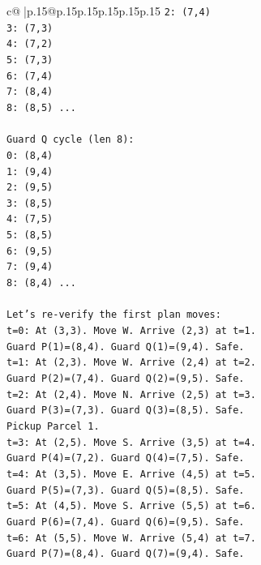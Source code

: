 \documentclass{article}
\begin{document}
{\begin{supertabular}{c@{$\;$}|p{.15\linewidth}@{}p{.15\linewidth}p{.15\linewidth}p{.15\linewidth}p{.15\linewidth}p{.15\linewidth}}
{{{\texttt{2: (7,4)} \\
\texttt{3: (7,3)} \\
\texttt{4: (7,2)} \\
\texttt{5: (7,3)} \\
\texttt{6: (7,4)} \\
\texttt{7: (8,4)} \\
\texttt{8: (8,5) ...} \\
\\ 
\texttt{Guard Q cycle (len 8):} \\
\texttt{0: (8,4)} \\
\texttt{1: (9,4)} \\
\texttt{2: (9,5)} \\
\texttt{3: (8,5)} \\
\texttt{4: (7,5)} \\
\texttt{5: (8,5)} \\
\texttt{6: (9,5)} \\
\texttt{7: (9,4)} \\
\texttt{8: (8,4) ...} \\
\\ 
\texttt{Let's re{-}verify the first plan moves:} \\
\texttt{t=0: At (3,3). Move W. Arrive (2,3) at t=1.} \\
\texttt{Guard P(1)=(8,4). Guard Q(1)=(9,4). Safe.} \\
\texttt{t=1: At (2,3). Move W. Arrive (2,4) at t=2.} \\
\texttt{Guard P(2)=(7,4). Guard Q(2)=(9,5). Safe.} \\
\texttt{t=2: At (2,4). Move N. Arrive (2,5) at t=3.} \\
\texttt{Guard P(3)=(7,3). Guard Q(3)=(8,5). Safe.} \\
\texttt{Pickup Parcel 1.} \\
\texttt{t=3: At (2,5). Move S. Arrive (3,5) at t=4.} \\
\texttt{Guard P(4)=(7,2). Guard Q(4)=(7,5). Safe.} \\
\texttt{t=4: At (3,5). Move E. Arrive (4,5) at t=5.} \\
\texttt{Guard P(5)=(7,3). Guard Q(5)=(8,5). Safe.} \\
\texttt{t=5: At (4,5). Move S. Arrive (5,5) at t=6.} \\
\texttt{Guard P(6)=(7,4). Guard Q(6)=(9,5). Safe.} \\
\texttt{t=6: At (5,5). Move W. Arrive (5,4) at t=7.} \\
\texttt{Guard P(7)=(8,4). Guard Q(7)=(9,4). Safe.} \\
}}}
\end{supertabular}}
\end{document}
